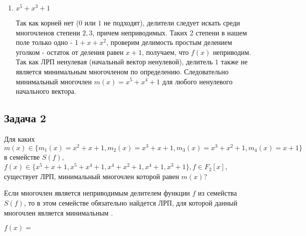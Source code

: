 \documentclass[utf8x, 14pt]{G7-32} %
\begin{document}
\begin{enumerate}
    \item $ x^5+x^3+1$
    
    Так как корней нет ($0$ или $1$ не подходят), делители следует искать среди многочленов степени $2,3$, причем неприводимых. Таких 2 степени в нашем поле только одно - $1 + x + x^2$, проверим делимость простым делением уголком - остаток от деления равен $x+1$, получаем, что $f(x)$ неприводим. Так как ЛРП ненулевая (начальный вектор ненулевой), делитель $1$ также не является минимальным многочленом по определению. Следовательно минимальный многочлен $m(x) = x^5+x^4+1$ для любого ненулевого начального вектора.    

    
\end{enumerate}

\subsection{Задача 2}
Для каких $m(x)\in\{m_1(x)=x^2+x+1, m_2(x)=x^3+x+1, m_3(x)=x^3+x^2+1, m_4(x)=x+1\}$ в семействе $S(f)$, $f(x)\in \{x^5+x+1, x^5+x^4+1, x^4+x^2+1, x^4+1, x^3+1\}, f\in F_2[x]$, существует ЛРП, минимальный многочлен которой равен $m(x)$?

Если многочлен является неприводимым делителем функции $f$ из семейства $S(f)$, то в этом семействе обязательно найдется ЛРП, для которой данный многочлен является минимальным \cite{hse:Teoria_Gener}. 

$f(x) = $
\end{document}
